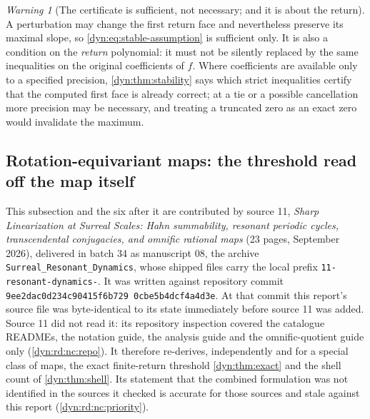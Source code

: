 \documentclass[11pt,letterpaper]{article}
\theoremstyle{definition}
\theoremstyle{remark}
\newtheorem{warning}[warning]{Warning}
\numberwithin{equation}{section}
\begin{document}
\begin{warning}[The certificate is sufficient, not necessary; and it is
about the return]\label{dyn:warn:stability}
A perturbation may change the first return face and nevertheless preserve
its maximal slope, so \eqref{dyn:eq:stable-assumption} is sufficient only.
It is also a condition on the \emph{return} polynomial: it must not be
silently replaced by the same inequalities on the original coefficients of
$f$. Where coefficients are available only to a specified precision,
\cref{dyn:thm:stability} says which strict inequalities certify that the
computed first face is already correct; at a tie or a possible cancellation
more precision may be necessary, and treating a truncated zero as an exact
zero would invalidate the maximum.
\end{warning}

\subsection{Rotation-equivariant maps: the threshold read off the map itself}
\label{dyn:rd:subsec}

This subsection and the six after it are contributed by source 11,
\emph{Sharp Linearization at Surreal Scales: Hahn summability, resonant
periodic cycles, transcendental conjugacies, and omnific rational maps}
(23 pages, September 2026), delivered in batch 34 as manuscript 08, the
archive \texttt{Surreal\_Resonant\_Dynamics}, whose shipped files carry the
local prefix \texttt{11-resonant-dynamics-}. It was written against
repository commit
\texttt{9ee2dac0\allowbreak d234c904\allowbreak 15f6b729\allowbreak
0cbe5b4d\allowbreak cf4a4d3e}. At that commit this report's source file was
byte-identical to its state immediately before source 11 was added. Source
11 did not read it: its repository inspection covered the catalogue
READMEs, the notation guide, the analysis guide and the omnific-quotient
guide only (\ref{dyn:rd:nc:repo}). It therefore re-derives, independently
and for a special class of maps, the exact finite-return threshold
\cref{dyn:thm:exact} and the shell count of \cref{dyn:thm:shell}. Its
statement that the combined formulation was not identified in the sources
it checked is accurate for those sources and stale against this report
(\ref{dyn:rd:nc:priority}).
\end{document}

